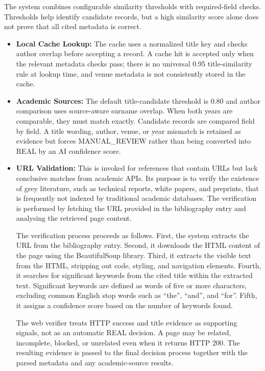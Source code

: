 \documentclass[12pt,a4paper,oneside]{report}
\begin{document}
The system combines configurable similarity thresholds with required-field checks. Thresholds help identify candidate records, but a high similarity score alone does not prove that all cited metadata is correct.
\begin{itemize}
    \item \textbf{Local Cache Lookup:} The cache uses a normalized title key and checks author overlap before accepting a record. A cache hit is accepted only when the relevant metadata checks pass; there is no universal 0.95 title-similarity rule at lookup time, and venue metadata is not consistently stored in the cache.
    \item \textbf{Academic Sources:} The default title-candidate threshold is 0.80 and author comparison uses source-aware surname overlap. When both years are comparable, they must match exactly. Candidate records are compared field by field. A title wording, author, venue, or year mismatch is retained as evidence but forces MANUAL\_REVIEW rather than being converted into REAL by an AI confidence score.
\item \textbf{URL Validation:} This is invoked for references that contain URLs but lack conclusive matches from academic APIs. Its purpose is to verify the existence of grey literature, such as technical reports, white papers, and preprints, that is frequently not indexed by traditional academic databases. The verification is performed by fetching the URL provided in the bibliography entry and analysing the retrieved page content.

The verification process proceeds as follows. First, the system extracts the URL from the bibliography entry. Second, it downloads the HTML content of the page using the BeautifulSoup library. Third, it extracts the visible text from the HTML, stripping out code, styling, and navigation elements. Fourth, it searches for significant keywords from the cited title within the extracted text. Significant keywords are defined as words of five or more characters, excluding common English stop words such as ``the'', ``and'', and ``for''. Fifth, it assigns a confidence score based on the number of keywords found.

The web verifier treats HTTP success and title evidence as supporting signals, not as an automatic REAL decision. A page may be related, incomplete, blocked, or unrelated even when it returns HTTP 200. The resulting evidence is passed to the final decision process together with the parsed metadata and any academic-source results.


\end{itemize}
\end{document}
